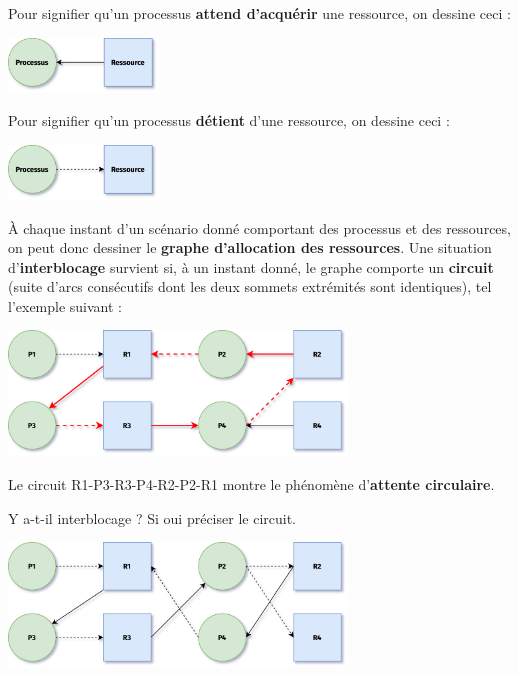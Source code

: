 \documentclass[12pt,a4paper,article,firamath]{nsi}
\begin{document}
\maketitle
Pour signifier qu'un processus \textbf{attend d'acquérir} une ressource, on dessine ceci :
\begin{center}
\includegraphics[width=4cm]{img/d1}
\end{center}

Pour signifier qu'un processus \textbf{détient} d'une ressource, on dessine ceci :
\begin{center}
\includegraphics[width=4cm]{img/d2}
\end{center}

À chaque instant d'un scénario donné comportant des processus et des ressources, on peut donc dessiner le \textbf{graphe d'allocation des ressources}.
Une situation d'\textbf{interblocage} survient si, à un instant donné, le graphe comporte un \textbf{circuit} (suite d'arcs consécutifs dont les deux sommets extrémités sont identiques), tel l'exemple suivant :

\begin{center}
\includegraphics[width=9cm]{img/d5}
\end{center}
Le circuit R1-P3-R3-P4-R2-P2-R1 montre le phénomène d'\textbf{attente circulaire}.

\begin{exercice}[]
Y a-t-il interblocage ? Si oui préciser le circuit.
\begin{center}
\includegraphics[width=9cm]{img/d3}
\end{center}
\end{exercice}
\end{document}
